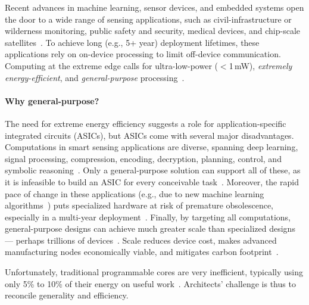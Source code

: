Recent advances in machine learning,
sensor devices, and
embedded systems open the door
to a wide range of sensing applications,
such as
civil-infrastructure or wilderness monitoring,
public safety and security,
medical devices,
and chip-scale satellites~\cite{kicksat2}.
%
To achieve long (e.g., 5+ year) deployment lifetimes,
these applications rely on on-device processing
to limit off-device communication.
%
Computing at the extreme edge
calls for ultra-low-power ($<$1\,mW),
\emph{extremely energy-efficient},
and \emph{general-purpose} processing~\cite{sonic}.

\paragraph{Why general-purpose?} 
The need for extreme energy efficiency suggests a role for
application-specific integrated circuits (ASICs), but ASICs
come with several major disadvantages.
%
Computations in smart sensing applications are diverse, spanning deep
learning, signal processing, compression, encoding, decryption,
planning, control, and symbolic reasoning~\cite{Gobieski2018IntermittentDN}.
%
Only a general-purpose solution can support all of these, as it is
infeasible to build an ASIC for every conceivable task~\cite{edge-offload,moonwalk}.
%
Moreover, the rapid pace of change in these applications (e.g., due to
new machine learning algorithms~\cite{jouppi2021ten})
puts specialized hardware at risk of premature obsolescence, especially in
a multi-year deployment~\cite{edge-offload}.
%
Finally, by targeting all computations, general-purpose designs
can achieve much greater scale than specialized designs --- perhaps trillions of devices~\cite{arm-trillions}.
Scale reduces device cost,
makes advanced manufacturing nodes economically viable,
and mitigates carbon footprint~\cite{gupta2022chasing}.

Unfortunately, traditional programmable cores are very inefficient,
typically using only 5\% to 10\% of their energy on useful work~\cite{manic,snafu,horowitz:isscc14:energy-keynote}.
%
Architects' challenge is thus to reconcile generality and efficiency.

